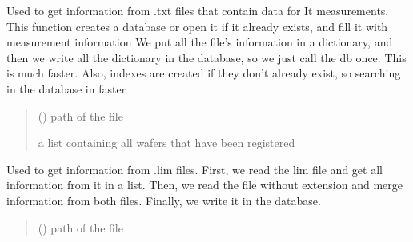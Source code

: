 \documentclass[letterpaper,10pt,english]{sphinxmanual}
\begin{document}
\begin{fulllineitems}
\label{\detokenize{new_manage_DB:new_manage_DB.create_db_it}}
\pysigstartsignatures
{}
\pysigstopsignatures
\sphinxAtStartPar
Used to get information from .txt files that contain data for It measurements.
This function creates a database or open it if it already exists, and fill it with measurement information
We put all the file’s information in a dictionary, and then we write all the dictionary in the database, so we just call the db once.
This is much faster.
Also, indexes are created if they don’t already exist, so searching in the database in faster
\begin{quote}\begin{description}
\sphinxAtStartPar
{} () \textendash{} path of the file

\sphinxAtStartPar
a list containing all wafers that have been registered

\end{description}\end{quote}

\end{fulllineitems}


\begin{fulllineitems}
\label{\detokenize{new_manage_DB:new_manage_DB.create_db_lim}}
\pysigstartsignatures
{}
\pysigstopsignatures
\sphinxAtStartPar
Used to get information from .lim files.
First, we read the lim file and get all information from it in a list.
Then, we read the file without extension and merge information from both files.
Finally, we write it in the database.
\begin{quote}\begin{description}
\sphinxAtStartPar
{} () \textendash{} path of the file

\end{description}\end{quote}

\end{fulllineitems}
\end{document}

